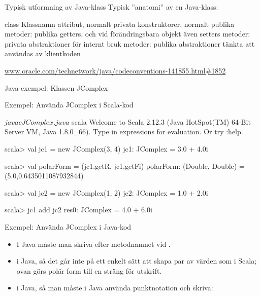 
\begin{Slide}{Typisk utformning av Java-klass}
Typisk ''anatomi'' av en Java-klass:
\begin{Code}[language=Java]
class Klassnamn {
    attribut, normalt privata
    konstruktorer, normalt publika
    metoder: publika getters, och vid förändringsbara objekt även setters
    metoder: privata abstraktioner för internt bruk
    metoder: publika abstraktioner tänkta att användas av klientkoden
}
\end{Code}
\href{http://www.oracle.com/technetwork/java/codeconventions-141855.html#1852}{www.oracle.com/technetwork/java/codeconventions-141855.html\#1852}
\end{Slide}




\begin{Slide}{Java-exempel: Klassen JComplex}\SlideFontSmall
{}
\end{Slide}




\begin{Slide}{Exempel: Använda JComplex i Scala-kod}
\begin{REPL}
$ javac JComplex.java
$ scala
Welcome to Scala 2.12.3 (Java HotSpot(TM) 64-Bit Server VM, Java 1.8.0_66).
Type in expressions for evaluation. Or try :help.

scala> val jc1 = new JComplex(3, 4)
jc1: JComplex = 3.0 + 4.0i

scala> val polarForm = (jc1.getR, jc1.getFi)
polarForm: (Double, Double) = (5.0,0.6435011087932844)

scala> val jc2 = new JComplex(1, 2)
jc2: JComplex = 1.0 + 2.0i

scala> jc1 add jc2
res0: JComplex = 4.0 + 6.0i
\end{REPL}
\end{Slide}




\begin{Slide}{Exempel: Använda JComplex i Java-kod}\SlideFontSmall
{}
\begin{itemize}
\item I Java måste man skriva  efter metodnamnet vid .

\item {} i Java, så det går inte på ett enkelt sätt att skapa par av värden som i Scala; ovan görs polär form till en sträng för utskrift.

\item {} i Java, så man måste i Java använda punktnotation och skriva: 
\end{itemize}
\end{Slide}










